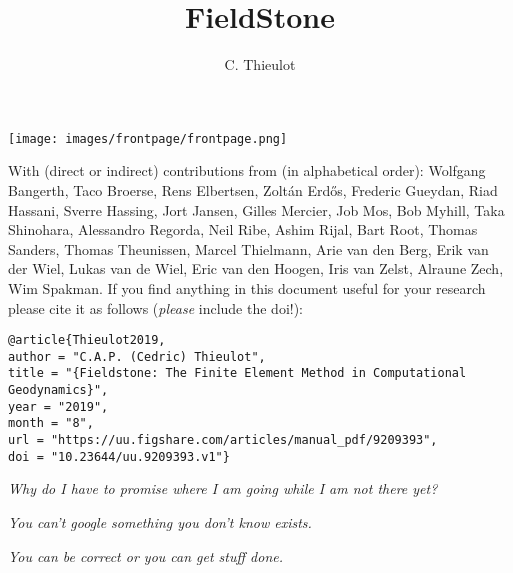 \documentclass[a4paper,12pt]{report}
\title{FieldStone}
\author{C. Thieulot}
\begin{document}
\thispagestyle{empty}
\texttt{[image: images/frontpage/frontpage.png]}

{\scriptsize With (direct or indirect) contributions from (in alphabetical order): 
Wolfgang Bangerth, 
Taco Broerse,
Rens Elbertsen,
Zolt{\'a}n Erd{\H{o}}s, 
Frederic Gueydan,
Riad Hassani,
Sverre Hassing,
Jort Jansen,
Gilles Mercier,
Job Mos, 
Bob Myhill,
Taka Shinohara, 
Alessandro Regorda,
Neil Ribe,
Ashim Rijal,
Bart Root,
Thomas Sanders,
Thomas Theunissen,
Marcel Thielmann,
Arie van den Berg,
Erik van der Wiel, 
Lukas van de Wiel, 
Eric van den Hoogen, 
Iris van Zelst,
Alraune Zech, 
Wim Spakman.}
\newpage
If you find anything in this document useful for your research please cite it 
as follows ({\it please} include the doi!):

\begin{verbatim}
@article{Thieulot2019,
author = "C.A.P. (Cedric) Thieulot",
title = "{Fieldstone: The Finite Element Method in Computational Geodynamics}",
year = "2019",
month = "8",
url = "https://uu.figshare.com/articles/manual_pdf/9209393",
doi = "10.23644/uu.9209393.v1"}
\end{verbatim}

\vspace{7cm}

\begin{center}
{\sl Why do I have to promise where I am going while I am not there yet?}

\vspace{1cm}

{\sl You can't google something you don't know exists.}

\vspace{1cm}

{\sl You can be correct or you can get stuff done.}
\end{center}

\clearpage
\tableofcontents

\end{document}
